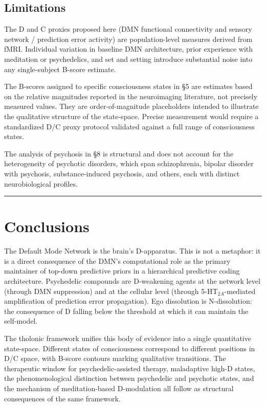 \documentclass[12pt]{article}
\begin{document}
\subsection{Limitations}\label{limitations}

The D and C proxies proposed here (DMN functional connectivity and
sensory network / prediction error activity) are population-level
measures derived from fMRI. Individual variation in baseline DMN
architecture, prior experience with meditation or psychedelics, and set
and setting introduce substantial noise into any single-subject B-score
estimate.

The B-scores assigned to specific consciousness states in §5 are
estimates based on the relative magnitudes reported in the neuroimaging
literature, not precisely measured values. They are order-of-magnitude
placeholders intended to illustrate the qualitative structure of the
state-space. Precise measurement would require a standardized D/C proxy
protocol validated against a full range of consciousness states.

The analysis of psychosis in §8 is structural and does not account for
the heterogeneity of psychotic disorders, which span schizophrenia,
bipolar disorder with psychosis, substance-induced psychosis, and
others, each with distinct neurobiological profiles.

\begin{center}\rule{0.5\linewidth}{0.5pt}\end{center}

\section{Conclusions}\label{conclusions}

The Default Mode Network is the brain's D-apparatus. This is not a
metaphor: it is a direct consequence of the DMN's computational role as
the primary maintainer of top-down predictive priors in a hierarchical
predictive coding architecture. Psychedelic compounds are D-weakening
agents at the network level (through DMN suppression) and at the
cellular level (through 5-HT\(_{2A}\)-mediated amplification of
prediction error propagation). Ego dissolution is N-dissolution: the
consequence of D falling below the threshold at which it can maintain
the self-model.

The tholonic framework unifies this body of evidence into a single
quantitative state-space. Different states of consciousness correspond
to different positions in D/C space, with B-score contours marking
qualitative transitions. The therapeutic window for psychedelic-assisted
therapy, maladaptive high-D states, the phenomenological distinction
between psychedelic and psychotic states, and the mechanism of
meditation-based D-modulation all follow as structural consequences of
the same framework.
\end{document}
